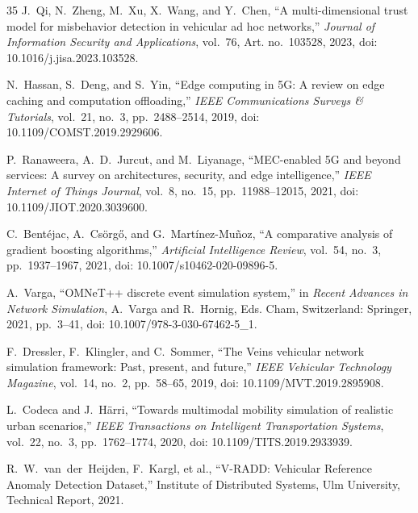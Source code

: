 \documentclass[conference]{IEEEtran}
\begin{document}
\begin{thebibliography}{35}
J.~Qi, N.~Zheng, M.~Xu, X.~Wang, and Y.~Chen,
``A multi-dimensional trust model for misbehavior detection in vehicular ad hoc networks,''
\textit{Journal of Information Security and Applications}, vol.~76, Art. no.~103528, 2023, doi: 10.1016/j.jisa.2023.103528.

N.~Hassan, S.~Deng, and S.~Yin,
``Edge computing in 5G: A review on edge caching and computation offloading,''
\textit{IEEE Communications Surveys \& Tutorials}, vol.~21, no.~3, pp.~2488--2514, 2019, doi: 10.1109/COMST.2019.2929606.

P.~Ranaweera, A.~D.~Jurcut, and M.~Liyanage,
``MEC-enabled 5G and beyond services: A survey on architectures, security, and edge intelligence,''
\textit{IEEE Internet of Things Journal}, vol.~8, no.~15, pp.~11988--12015, 2021, doi: 10.1109/JIOT.2020.3039600.

C.~Bent{\'e}jac, A.~Cs{\"o}rg{\H{o}}, and G.~Mart{\'i}nez-Mu{\~n}oz,
``A comparative analysis of gradient boosting algorithms,''
\textit{Artificial Intelligence Review}, vol.~54, no.~3, pp.~1937--1967, 2021, doi: 10.1007/s10462-020-09896-5.

A.~Varga,
``OMNeT++ discrete event simulation system,''
in \textit{Recent Advances in Network Simulation}, A.~Varga and R.~Hornig, Eds. Cham, Switzerland: Springer, 2021, pp.~3--41, doi: 10.1007/978-3-030-67462-5\_1.

F.~Dressler, F.~Klingler, and C.~Sommer,
``The Veins vehicular network simulation framework: Past, present, and future,''
\textit{IEEE Vehicular Technology Magazine}, vol.~14, no.~2, pp.~58--65, 2019, doi: 10.1109/MVT.2019.2895908.

L.~Codeca and J.~H{\"a}rri,
``Towards multimodal mobility simulation of realistic urban scenarios,''
\textit{IEEE Transactions on Intelligent Transportation Systems}, vol.~22, no.~3, pp.~1762--1774, 2020, doi: 10.1109/TITS.2019.2933939.

R.~W.~van~der~Heijden, F.~Kargl, et al.,
``V-RADD: Vehicular Reference Anomaly Detection Dataset,''
Institute of Distributed Systems, Ulm University, Technical Report, 2021.
\end{thebibliography}
\end{document}
